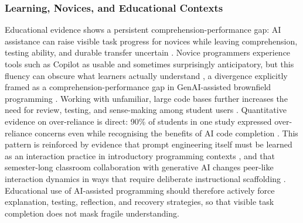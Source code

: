 \subsubsection{Learning, Novices, and Educational Contexts}
\label{sec:hai-learning}
Educational evidence shows a persistent comprehension-performance gap: AI assistance can raise visible task progress for novices while leaving comprehension, testing ability, and durable transfer uncertain \cite{prather_its_2024,qiao_comprehension-performance_2025,shah_students_2025}. Novice programmers experience tools such as Copilot as usable and sometimes surprisingly anticipatory, but this fluency can obscure what learners actually understand \cite{prather_its_2024}, a divergence explicitly framed as a comprehension-performance gap in GenAI-assisted brownfield programming \cite{qiao_comprehension-performance_2025}. Working with unfamiliar, large code bases further increases the need for review, testing, and sense-making among student users \cite{shah_students_2025}. Quantitative evidence on over-reliance is direct: 90\% of students in one study expressed over-reliance concerns even while recognising the benefits of AI code completion \cite{takerngsaksiri_students_2024}. This pattern is reinforced by evidence that prompt engineering itself must be learned as an interaction practice in introductory programming contexts \cite{denny_conversing_2023}, and that semester-long classroom collaboration with generative AI changes peer-like interaction dynamics in ways that require deliberate instructional scaffolding \cite{lyu_will_2025}. Educational use of AI-assisted programming should therefore actively force explanation, testing, reflection, and recovery strategies, so that visible task completion does not mask fragile understanding.

